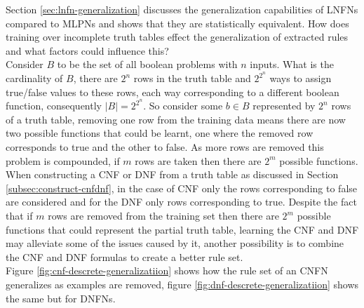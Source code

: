 Section \ref{sec:lnfn-generalization} discusses the generalization capabilities of LNFNs compared to MLPNs and shows that they are statistically equivalent. How does training over incomplete truth tables effect the generalization of extracted rules and what factors could influence this?\\

Consider $B$ to be the set of all boolean problems with $n$ inputs. What is the cardinality of $B$, there are $2^n$ rows in the truth table and $2^{2^n}$ ways to assign true/false values to these rows, each way corresponding to a different boolean function, consequently $|B| = 2^{2^n}$. So consider some $b \in B$ represented by $2^n$ rows of a truth table, removing one row from the training data means there are now two possible functions that could be learnt, one where the removed row corresponds to true and the other to false. As more rows are removed this problem is compounded, if $m$ rows are taken then there are $2^m$ possible functions.\\

When constructing a CNF or DNF from a truth table as discussed in Section \ref{subsec:construct-cnfdnf}, in the case of CNF only the rows corresponding to false are considered and for the DNF only rows corresponding to true. Despite the fact that if $m$ rows are removed from the training set then there are $2^m$ possible functions that could represent the partial truth table, learning the CNF and DNF may alleviate some of the issues caused by it, another possibility is to combine the CNF and DNF formulas to create a better rule set.\\

Figure \ref{fig:cnf-descrete-generalizatiion} shows how the rule set of an CNFN generalizes as examples are removed, figure \ref{fig:dnf-descrete-generalizatiion} shows the same but for DNFNs.

